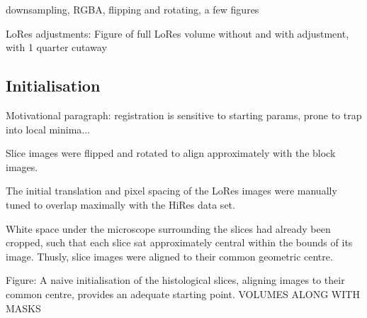     downsampling, RGBA, flipping and rotating, a few figures
    
    LoRes adjustments:
    Figure of full LoRes volume without and with adjustment, with 1 quarter cutaway
    
  
  \subsection{Initialisation} %
  \label{sub:initialisation}
    Motivational paragraph: registration is sensitive to starting params, prone to trap into local minima...
      
    Slice images were flipped and rotated to align approximately with the block images. 
    
    The initial translation and pixel spacing of the LoRes images were manually tuned to overlap maximally with the HiRes data set.
    
    White space under the microscope surrounding the slices had already been cropped, such that each slice sat approximately central within the bounds of its image. Thusly, slice images were aligned to their common geometric centre.
    
    Figure: A naive initialisation of the histological slices, aligning images to their common centre, provides an adequate starting point. VOLUMES ALONG WITH MASKS
    
